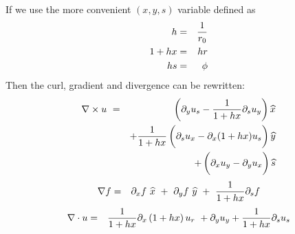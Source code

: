 \documentclass[11pt]{article} %
\begin{document}
If we use the more convenient $(x,y,s)$ variable defined as
%
\begin{eqnarray}h &=
& {1 \over {r}_{0}}\nonumber \\
 1+hx &=
& hr\nonumber \\
 hs &=
& \phi \end{eqnarray}
%
Then the curl, gradient and divergence  can be rewritten:
%
\begin{eqnarray}\nabla \times u\ &=
& \left({{\partial }_{y}{u}_{s}-{1 \over 1+hx}{\partial }_{s}{u}_{y}}\right)\widehat{x}\nonumber \\
 &&+{1 \over 1+hx}\left({{\partial }_{s}{u}_{x}-\vphantom{{1 \over 1+hx}}{\partial }_{x}(1+hx){u}_{s}}\right)\widehat{y}\nonumber \\
 &&+\left({{\partial }_{x}{u}_{y}-\vphantom{{1 \over 1+hx}}{\partial }_{y}{u}_{x}}\right)\widehat{s}\end{eqnarray}
%
%
\begin{eqnarray}\nabla f &=
& {\partial }_{x}f\ \widehat{x}\ +\ {\partial }_{y}f\ \widehat{y}\ +\ {1 \over 1+hx}{\partial }_{s}f\end{eqnarray}
%
%
\begin{eqnarray}\nabla \cdot u&=
& {1 \over 1+hx}{\partial }_{x}\left({1+hx}\right){u}_{r}\ +{\partial }_{y}{u}_{y}+{1 \over 1+hx}{\partial }_{s}{u}_{s}\end{eqnarray}
%
\end{document}
